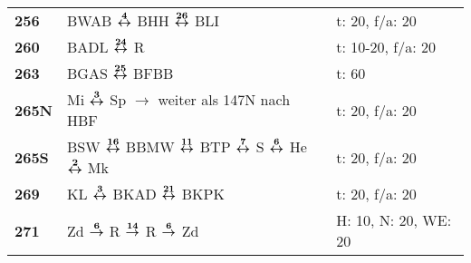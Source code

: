 \begin{minipage}[t]{0.45\textwidth}
\begin{tabular}{>{\bfseries}L{1.2cm}L{9.0cm}L{3.0cm}}
\bus{} 256    & BWAB $\boldsymbol{\overset{4}{\leftrightarrow}}$ BHH $\boldsymbol{\overset{26}{\leftrightarrow}}$ BLI                                                                                                                               & t: 20, f/a: 20             \\
\bus{} 260    & BADL $\boldsymbol{\overset{24}{\leftrightarrow}}$ R                                                                                                                                                 & t: 10-20, f/a: 20          \\
\bus{} 263    & BGAS $\boldsymbol{\overset{25}{\leftrightarrow}}$ BFBB & t: 60 \\
\bus{} 265N   & Mi $\boldsymbol{\overset{3}{\leftrightarrow}}$ Sp $\rightarrow$ weiter als 147N nach HBF & t: 20, f/a: 20 \\
\bus{} 265S   & BSW $\boldsymbol{\overset{16}{\leftrightarrow}}$ BBMW $\boldsymbol{\overset{11}{\leftrightarrow}}$ BTP $\boldsymbol{\overset{7}{\leftrightarrow}}$ S $\boldsymbol{\overset{6}{\leftrightarrow}}$ He $\boldsymbol{\overset{2}{\leftrightarrow}}$ Mk & t: 20, f/a: 20             \\
\bus{} 269    & KL $\boldsymbol{\overset{3}{\leftrightarrow}}$ BKAD $\boldsymbol{\overset{21}{\leftrightarrow}}$ BKPK
& t: 20, f/a: 20             \\
\bus{} 271    & Zd $\boldsymbol{\overset{6}{\rightarrow}}$ R $\boldsymbol{\overset{14}{\rightarrow}}$ R $\boldsymbol{\overset{6}{\rightarrow}}$ Zd                      & H: 10, N: 20, WE: 20 \\
\hline
\end{tabular}
\end{minipage}
\begin{minipage}[t]{0.05\textwidth}
\phantom{Tor}
\end{minipage}

